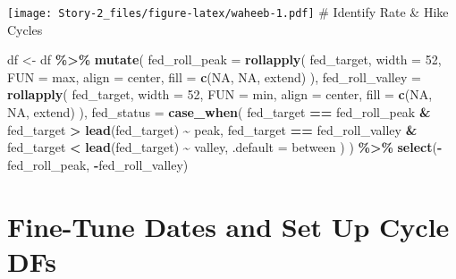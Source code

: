 \documentclass[
]{article}
\newenvironment{Shaded}{\begin{snugshade}}{\end{snugshade}}
\newcommand{\AttributeTok}[1]{\textcolor[rgb]{0.13,0.29,0.53}{#1}}
\newcommand{\ConstantTok}[1]{\textcolor[rgb]{0.56,0.35,0.01}{#1}}
\newcommand{\DecValTok}[1]{\textcolor[rgb]{0.00,0.00,0.81}{#1}}
\newcommand{\FunctionTok}[1]{\textcolor[rgb]{0.13,0.29,0.53}{\textbf{#1}}}
\newcommand{\NormalTok}[1]{#1}
\newcommand{\OtherTok}[1]{\textcolor[rgb]{0.56,0.35,0.01}{#1}}
\newcommand{\SpecialCharTok}[1]{\textcolor[rgb]{0.81,0.36,0.00}{\textbf{#1}}}
\newcommand{\StringTok}[1]{\textcolor[rgb]{0.31,0.60,0.02}{#1}}
\begin{document}
\texttt{[image: Story-2\_files/figure-latex/waheeb-1.pdf]} \# Identify
Rate \& Hike Cycles

\begin{Shaded}
\begin{Highlighting}[]
\NormalTok{df }\OtherTok{\textless{}{-}}\NormalTok{ df }\SpecialCharTok{\%\textgreater{}\%}
  \FunctionTok{mutate}\NormalTok{(}
    \AttributeTok{fed\_roll\_peak =} \FunctionTok{rollapply}\NormalTok{(}
\NormalTok{      fed\_target, }\AttributeTok{width =} \DecValTok{52}\NormalTok{, }\AttributeTok{FUN =}\NormalTok{ max, }
      \AttributeTok{align =} \StringTok{\textquotesingle{}center\textquotesingle{}}\NormalTok{, }\AttributeTok{fill =} \FunctionTok{c}\NormalTok{(}\ConstantTok{NA}\NormalTok{, }\ConstantTok{NA}\NormalTok{, }\StringTok{\textquotesingle{}extend\textquotesingle{}}\NormalTok{)}
\NormalTok{    ),}
    \AttributeTok{fed\_roll\_valley =} \FunctionTok{rollapply}\NormalTok{(}
\NormalTok{      fed\_target, }\AttributeTok{width =} \DecValTok{52}\NormalTok{, }\AttributeTok{FUN =}\NormalTok{ min, }
      \AttributeTok{align =} \StringTok{\textquotesingle{}center\textquotesingle{}}\NormalTok{, }\AttributeTok{fill =} \FunctionTok{c}\NormalTok{(}\ConstantTok{NA}\NormalTok{, }\ConstantTok{NA}\NormalTok{, }\StringTok{\textquotesingle{}extend\textquotesingle{}}\NormalTok{)}
\NormalTok{    ),}
    \AttributeTok{fed\_status =} \FunctionTok{case\_when}\NormalTok{(}
\NormalTok{      fed\_target }\SpecialCharTok{==}\NormalTok{ fed\_roll\_peak }\SpecialCharTok{\&}\NormalTok{ fed\_target }\SpecialCharTok{\textgreater{}} \FunctionTok{lead}\NormalTok{(fed\_target) }\SpecialCharTok{\textasciitilde{}} \StringTok{\textquotesingle{}peak\textquotesingle{}}\NormalTok{,}
\NormalTok{      fed\_target }\SpecialCharTok{==}\NormalTok{ fed\_roll\_valley }\SpecialCharTok{\&}\NormalTok{ fed\_target }\SpecialCharTok{\textless{}} \FunctionTok{lead}\NormalTok{(fed\_target) }\SpecialCharTok{\textasciitilde{}} \StringTok{\textquotesingle{}valley\textquotesingle{}}\NormalTok{,}
      \AttributeTok{.default =} \StringTok{\textquotesingle{}between\textquotesingle{}}
\NormalTok{    )}
\NormalTok{  ) }\SpecialCharTok{\%\textgreater{}\%}
  \FunctionTok{select}\NormalTok{(}\SpecialCharTok{{-}}\NormalTok{fed\_roll\_peak, }\SpecialCharTok{{-}}\NormalTok{fed\_roll\_valley)}
\end{Highlighting}
\end{Shaded}

\section{Fine-Tune Dates and Set Up Cycle
DFs}\label{fine-tune-dates-and-set-up-cycle-dfs}
\end{document}
